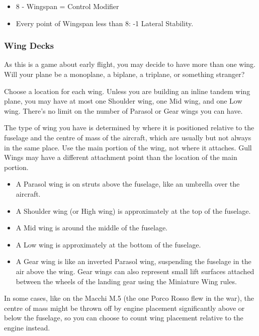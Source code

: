\documentclass{article}
\begin{document}
\begin{itemize}
    \item          8 - Wingspan = Control Modifier
    \item          Every point of Wingspan less than 8: -1 Lateral Stability.
\end{itemize}

\subsubsection{Wing Decks}
\label{_Wing Decks}

As this is a game about early flight, you may decide to have more than
one wing. Will your plane be a monoplane, a biplane, a triplane, or
something stranger?

Choose a location for each wing. Unless you are building an inline
tandem wing plane, you may have at most one Shoulder wing, one Mid wing,
and one Low wing. There's no limit on the number of Parasol or Gear
wings you can have.

The type of wing you have is determined by where it is positioned
relative to the fuselage and the centre of mass of the aircraft, which
are usually but not always in the same place.  Use the main portion of
the wing, not where it attaches.  Gull Wings may have a different attachment
point than the location of the main portion.

\begin{itemize}
    \item          A Parasol wing is on struts above the fuselage, like an
          umbrella over the aircraft.
    \item          A Shoulder wing (or High wing) is approximately at the top of the
          fuselage.
    \item          A Mid wing is around the middle of the fuselage.
    \item          A Low wing is approximately at the bottom of the fuselage.
    \item          A Gear wing is like an inverted Parasol wing, suspending the
          fuselage in the air above the wing. Gear wings can also represent
          small lift surfaces attached between the wheels of the landing gear
          using the Miniature Wing rules.
\end{itemize}

In some cases, like on the Macchi M.5 (the one Porco Rosso flew in the
war), the centre of mass might be thrown off by engine placement
significantly above or below the fuselage, so you can choose to count
wing placement relative to the engine instead.
\end{document}
